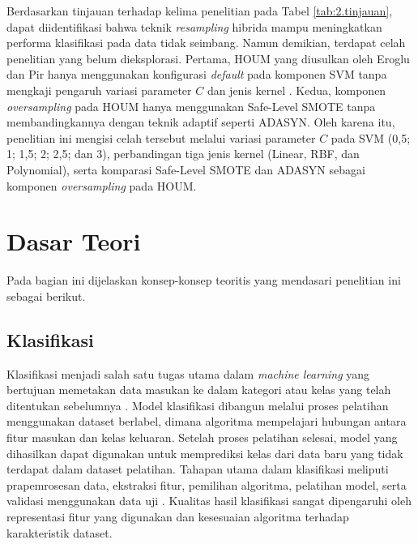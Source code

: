 Berdasarkan tinjauan terhadap kelima penelitian pada Tabel \ref{tab:2.tinjauan}, dapat diidentifikasi bahwa teknik \textit{resampling} hibrida mampu meningkatkan performa klasifikasi pada data tidak seimbang. Namun demikian, terdapat celah penelitian yang belum dieksplorasi. Pertama, HOUM yang diusulkan oleh Eroglu dan Pir hanya menggunakan konfigurasi \textit{default} pada komponen SVM tanpa mengkaji pengaruh variasi parameter $C$ dan jenis kernel \cite{Eroglu2024HOUM}. Kedua, komponen \textit{oversampling} pada HOUM hanya menggunakan Safe-Level SMOTE tanpa membandingkannya dengan teknik adaptif seperti ADASYN. Oleh karena itu, penelitian ini mengisi celah tersebut melalui variasi parameter $C$ pada SVM (0,5; 1; 1,5; 2; 2,5; dan 3), perbandingan tiga jenis kernel (Linear, RBF, dan Polynomial), serta komparasi Safe-Level SMOTE dan ADASYN sebagai komponen \textit{oversampling} pada HOUM.


\section{Dasar Teori} \label{II.Teori}
Pada bagian ini dijelaskan konsep-konsep teoritis yang mendasari penelitian ini sebagai berikut. \par

\subsection{Klasifikasi} \label{II.klasifikasi}
Klasifikasi menjadi salah satu tugas utama dalam \textit{machine learning} yang bertujuan memetakan data masukan ke dalam kategori atau kelas yang telah ditentukan sebelumnya \cite{Sarker2021ML}. Model klasifikasi dibangun melalui proses pelatihan menggunakan dataset berlabel, dimana algoritma mempelajari hubungan antara fitur masukan dan kelas keluaran. Setelah proses pelatihan selesai, model yang dihasilkan dapat digunakan untuk memprediksi kelas dari data baru yang tidak terdapat dalam dataset pelatihan. Tahapan utama dalam klasifikasi meliputi prapemrosesan data, ekstraksi fitur, pemilihan algoritma, pelatihan model, serta validasi menggunakan data uji \cite{Sarker2021ML, Mohammed2020Resampling}. Kualitas hasil klasifikasi sangat dipengaruhi oleh representasi fitur yang digunakan dan kesesuaian algoritma terhadap karakteristik dataset.

